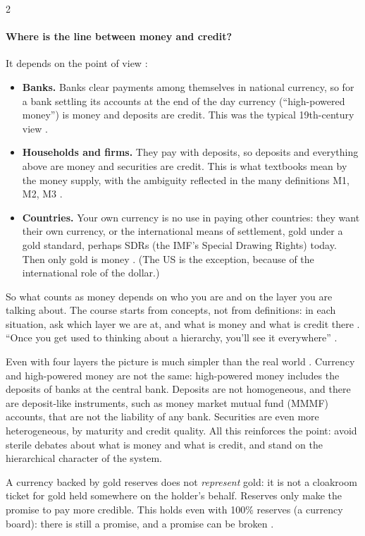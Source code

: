 \begin{paracol}{2}
\paragraph{Where is the line between money and credit?} It depends on the point of view :
\begin{itemize}
  \item \textbf{Banks.} Banks clear payments among themselves in national currency, so for a bank settling its
        accounts at the end of the day currency (``high-powered money'') is money and deposits are credit. This was
        the typical 19th-century view .
  \item \textbf{Households and firms.} They pay with deposits, so deposits and everything above are money and
        securities are credit. This is what textbooks mean by the money supply, with the ambiguity reflected in the
        many definitions M1, M2, M3 .
  \item \textbf{Countries.} Your own currency is no use in paying other countries: they want their own currency, or
        the international means of settlement, gold under a gold standard, perhaps SDRs (the IMF's Special Drawing
        Rights) today. Then only gold is money . (The US is the exception, because of the international
        role of the dollar.)
\end{itemize}
So what counts as money depends on who you are and on the layer you are talking about. The course starts from
concepts, not from definitions: in each situation, ask which layer we are at, and what is money and what is credit
there . ``Once you get used to thinking about a hierarchy, you'll see it everywhere''
.

\begin{secondary}
Even with four layers the picture is much simpler than the real world . Currency and high-powered
money are not the same: high-powered money includes the deposits of banks at the central bank. Deposits are not
homogeneous, and there are deposit-like instruments, such as money market mutual fund (MMMF) accounts, that are not
the liability of any bank. Securities are even more heterogeneous, by maturity and credit quality. All this
reinforces the point: avoid sterile debates about what is money and what is credit, and stand on the hierarchical
character of the system.
\end{secondary}

\begin{aside}
A currency backed by gold reserves does not \emph{represent} gold: it is not a cloakroom ticket for gold held
somewhere on the holder's behalf. Reserves only make the promise to pay more credible. This holds even with 100\%
reserves (a currency board): there is still a promise, and a promise can be broken .
\end{aside}


\end{paracol}
